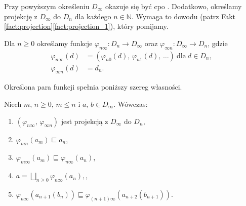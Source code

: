 Przy powyższym określeniu \(D_\infty\) okazuje się być cpo \cite[Tw. 16.36]{Hindley:2008:LCI:1388400}.
Dodatkowo, określamy projekcję z \(D_\infty\) do \(D_n\) dla każdego \(n\in\mathbb{N}\).
Wymaga to dowodu (patrz Fakt \ref{fact:projection}\ref{fact:projection_1}), który pomijamy.


\begin{definicja}%
Dla \(n\geq 0\) określamy funkcje \(\varphi_{n\infty}:D_n\to D_\infty\) oraz \(\varphi_{\infty n}: D_\infty \to D_n\), gdzie 
\begin{align*}
\varphi_{n\infty}(d) &= (\varphi_{n0}(d),\,\varphi_{n1}(d),\,\dots)\ \text{dla}\ d\in D_n,\\
\varphi_{\infty n}(d) &= d_n.
\end{align*}
\end{definicja}

Określona para funkcji spełnia poniższy szereg własności.

\begin{fakt}\label{fact:projection}%
Niech \(m,\,n\geq 0\), \(m\leq n\) i \(a,\,b\in D_\infty\). Wówczas:
\begin{enumerate}[label={(\roman*)}, ref={(\roman*)}] 
  \setlength\itemsep{0em}
  \item \((\varphi_{n\infty},\,\varphi_{\infty n})\) jest projekcją z \(D_\infty\) do \(D_n\),\label{fact:projection_1}
\item \(\varphi_{mn}(a_m)\sqsubseteq a_n\),\label{fact:projection_2}
\item \(\varphi_{m\infty}(a_m)\sqsubseteq \varphi_{n\infty}(a_n)\),\label{fact:projection_3}
\item \(a=\bigsqcup_{n\geq 0}\varphi_{n\infty}(a_n),\),\label{fact:projection_4}
\item \(\varphi_{n\infty}(a_{n+1}(b_n))\sqsubseteq\varphi_{(n+1)\infty}(a_{n+2}(b_{n+1}))\).\label{fact:projection_5}
\end{enumerate}
\end{fakt}

